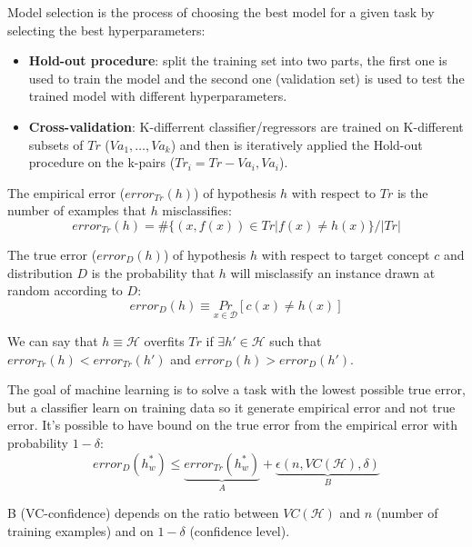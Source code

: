 \documentclass[12pt]{article}
\begin{document}
\begin{enumerate}[label=\textbf{ML.\arabic*}]
    Model selection is the process of choosing the best model for a given task by selecting the best hyperparameters:
    \begin{itemize}
        \item \textbf{Hold-out procedure}: split the training set into two parts, the first one is used to train the model and
        the second one (validation set) is used to test the trained model with different hyperparameters.
        \item \textbf{Cross-validation}: K-differrent classifier/regressors are trained on K-different subsets of $Tr$ ($Va_1,\ldots,Va_k$)
        and then is iteratively applied the Hold-out procedure on the k-pairs ($Tr_i=Tr-Va_i,Va_i$).
    \end{itemize}

    The empirical error ($error_{Tr}(h)$) of hypothesis $h$ with respect to $Tr$ is the number of examples that $h$ misclassifies:
    \begin{equation}\label{eq:empirical_error}
        error_{Tr}(h) = \#\{(x,f(x)) \in Tr|f(x)\neq h(x)\}/|Tr|
    \end{equation}

    The true error ($error_D(h)$) of hypothesis $h$ with respect to target concept $c$ and distribution $D$ is the probability that $h$ will misclassify an instance drawn at random according to $D$:
    \begin{equation}\label{eq:true_error}
        error_D(h) \equiv \underset{x\in\mathcal{D}}{Pr}[c(x)\neq h(x)]
    \end{equation}

    We can say that $h\equiv\mathcal{H}$ overfits $Tr$ if $\exists h'\in\mathcal{H}$ such that $error_{Tr}(h)<error_{Tr}(h')$ and $error_D(h)>error_D(h')$.

    The goal of machine learning is to solve a task with the lowest possible true error, but a classifier learn on training data so 
    it generate empirical error and not true error.
    It's possible to have bound on the true error from the empirical error with probability $1-\delta$:
    \begin{equation}\label{eq:confidence_interval}
        error_D(h^*_w) \leq \underbrace{error_{Tr}(h^*_w)}_A + \underbrace{\epsilon(n,VC(\mathcal{H}),\delta)}_B
    \end{equation}

    B (VC-confidence) depends on the ratio between $VC(\mathcal{H})$ and $n$ (number of training examples) and on $1- \delta$ (confidence level).


\end{enumerate}
\end{document}
